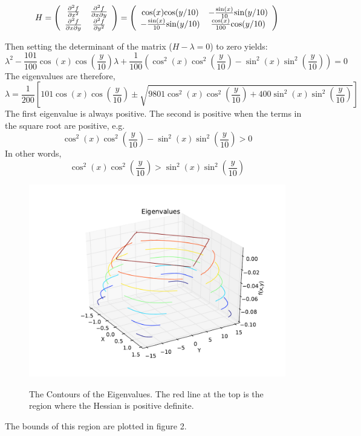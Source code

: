 \documentclass{article}
\begin{document}
\begin{equation*}
H = \left(
  \begin{array}{ c c }
     \frac{\partial^2 f}{\partial x^2} & \frac{\partial^2 f}{\partial x
      \partial y} \\
     \frac{\partial^2 f}{\partial x
      \partial y} & \frac{\partial^2 f}{\partial y^2}
  \end{array} \right)
= 
\left(
  \begin{array}{ c c }
     \text{cos}(x)\text{cos}(y/10) & -\frac{\text{sin}(x)}{10}\text{sin}(y/10) \\
     -\frac{\text{sin}(x)}{10}\text{sin}(y/10) & \frac{\text{cos}(x)}{100}\text{cos}(y/10)
  \end{array} \right)
\end{equation*}

Then setting the determinant of the matrix ($H - \lambda = 0$) to zero yields:
\begin{equation*}
		\lambda^2 - \frac{101}{100}\cos(x)\cos(\frac{y}{10})\lambda + \frac{1}{100}(\cos^2(x)\cos^2(\frac{y}{10}) - \sin^2(x)\sin^2(\frac{y}{10})) = 0
\end{equation*}
The eigenvalues are therefore,
\begin{equation*}
		\lambda = \frac{1}{200}\left[101\cos(x)\cos(\frac{y}{10}) \pm \sqrt{9801\cos^2(x)\cos^2(\frac{y}{10}) + 400\sin^2(x)\sin^2(\frac{y}{10})}\right]
\end{equation*}
The first eigenvalue is always positive. The second is positive when the
terms in the square root are positive, e.g. 
\begin{equation*}   
 \cos^2(x)\cos^2(\frac{y}{10}) - \sin^2(x)\sin^2(\frac{y}{10}) > 0
\end{equation*}
In other words,
\begin{equation*}
 \cos^2(x)\cos^2(\frac{y}{10}) > \sin^2(x)\sin^2(\frac{y}{10})
\end{equation*}

\begin{figure}[!htb]
  \includegraphics[scale=.5]{figs/eigen.pdf}
  \label{fig:3d}
  \caption{The Contours of the Eigenvalues. The red line at the top is
 the region where the Hessian is positive definite. }   
\end{figure}
The bounds of this region are plotted in figure 2. 
\end{document}
